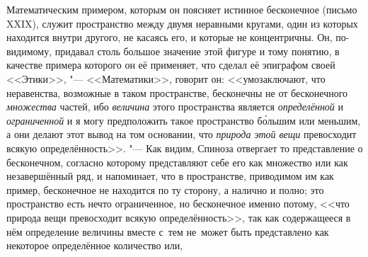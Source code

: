 Математическим примером, которым он поясняет истинное бесконечное (письмо
XXIX), служит пространство между двумя неравными кругами, один из которых
находится внутри другого, не касаясь его, и которые не концентричны. Он,
по-видимому, придавал столь большое значение этой фигуре и тому понятию,
в качестве примера которого он её
применяет, что сделал её эпиграфом своей <<Этики>>, "--- <<Математики>>, говорит он: <<умозаключают, что
неравенства, возможные в таком пространстве, бесконечны не от бесконечного
{\em множества} частей, ибо {\em величина} этого пространства является
{\em определённой} и {\em ограниченной} и я могу предположить такое
пространство б\'{о}льшим или меньшим, а они делают этот вывод на том основании,
что {\em природа этой вещи} превосходит всякую
определённость>>. "--- Как
видим, Спиноза отвергает то представление о бесконечном, согласно которому
представляют себе его как множество или как незавершённый ряд, и напоминает,
что в пространстве, приводимом им как пример, бесконечное не находится по ту
сторону, а налично и полно; это пространство есть нечто ограниченное, но
бесконечное именно потому, <<что природа вещи превосходит всякую
определённость>>, так как содержащееся в нём определение величины вместе с~тем
не~может быть представлено как некоторое определённое количество или,
